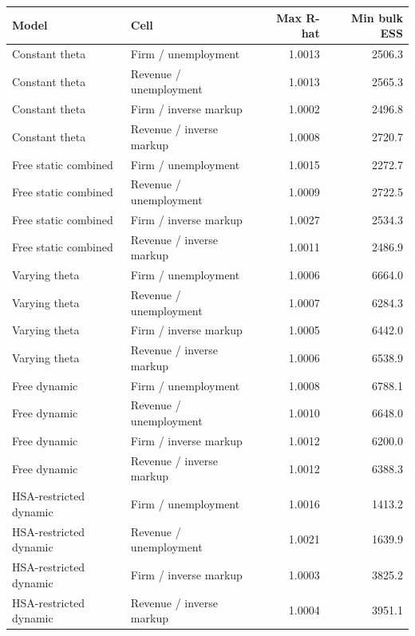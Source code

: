 \begin{tabular}{@{}llrr@{}}
\toprule
Model & Cell & Max R-hat & Min bulk ESS \\
\midrule
Constant theta & Firm / unemployment & 1.0013 & 2506.3 \\
Constant theta & Revenue / unemployment & 1.0013 & 2565.3 \\
Constant theta & Firm / inverse markup & 1.0002 & 2496.8 \\
Constant theta & Revenue / inverse markup & 1.0008 & 2720.7 \\
Free static combined & Firm / unemployment & 1.0015 & 2272.7 \\
Free static combined & Revenue / unemployment & 1.0009 & 2722.5 \\
Free static combined & Firm / inverse markup & 1.0027 & 2534.3 \\
Free static combined & Revenue / inverse markup & 1.0011 & 2486.9 \\
Varying theta & Firm / unemployment & 1.0006 & 6664.0 \\
Varying theta & Revenue / unemployment & 1.0007 & 6284.3 \\
Varying theta & Firm / inverse markup & 1.0005 & 6442.0 \\
Varying theta & Revenue / inverse markup & 1.0006 & 6538.9 \\
Free dynamic & Firm / unemployment & 1.0008 & 6788.1 \\
Free dynamic & Revenue / unemployment & 1.0010 & 6648.0 \\
Free dynamic & Firm / inverse markup & 1.0012 & 6200.0 \\
Free dynamic & Revenue / inverse markup & 1.0012 & 6388.3 \\
HSA-restricted dynamic & Firm / unemployment & 1.0016 & 1413.2 \\
HSA-restricted dynamic & Revenue / unemployment & 1.0021 & 1639.9 \\
HSA-restricted dynamic & Firm / inverse markup & 1.0003 & 3825.2 \\
HSA-restricted dynamic & Revenue / inverse markup & 1.0004 & 3951.1 \\
\bottomrule
\end{tabular}
